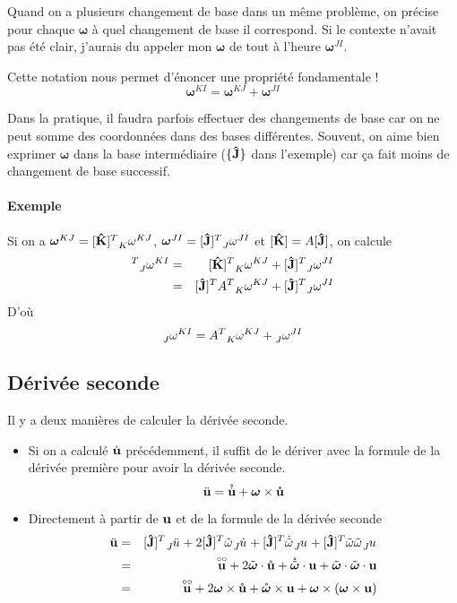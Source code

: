 \documentclass[11pt,a4paper]{article}
\newcommand\fv[1]{{\bf #1}} %
\newcommand\fvd[1]{\dot{\bf #1}} %
\newcommand\fvdd[1]{\ddot{\bf #1}} %
\newcommand\fvr[1]{\mathring{\bf #1}} %
\newcommand\fvrr[1]{\overset{\circ\circ}{\bf #1}} %
\newcommand\uj{{\bf\hat{J}}} %
\newcommand\uk{{\bf\hat{K}}} %
\newcommand\wrt[2]{\ensuremath{\tensor*[_{ #1}]{ #2}{}}} %
\newcommand\wtr[3]{\ensuremath{\tensor*[_{ #1}]{ #2}{^{ #3}}}} %
\newcommand\omegaf{{\bm \omega}}
\newcommand\omegafr{\mathring{\bm \omega}}
\newcommand\omegaft{\tilde{\bm \omega}}
\newcommand\omegaftr{\mathring{\tilde{\bm \omega}}}
\newcommand\omegat{\tilde{\omega}}
\begin{document}
Quand on a plusieurs changement de base dans un même problème, on précise pour chaque $\omegaf$ à quel changement de base il correspond.
Si le contexte n'avait pas été clair, j'aurais du appeler mon $\omegaf$ de tout à l'heure $\omegaf^{JI}$.

Cette notation nous permet d'énoncer une propriété fondamentale !
\[ \omegaf^{KI} = \omegaf^{KJ} + \omegaf^{JI} \]

Dans la pratique, il faudra parfois effectuer des changements de base car on ne peut somme des coordonnées dans des bases différentes.
Souvent, on aime bien exprimer $\omegaf$ dans la base intermédiaire ($\{\uj\}$ dans l'exemple) car ça fait moins de changement de base successif.

\paragraph{Exemple}
Si on a $\omegaf^{KJ} = [\uk]^T \wtr{K}{\omega}{KJ}$, $\omegaf^{JI} = [\uj]^T \wtr{J}{\omega}{JI}$ et $[\uk] = A[\uj]$, on calcule
\begin{eqnarray*}
	[\uj]^T \wtr{J}{\omega}{KI} &=& [\uk]^T \wtr{K}{\omega}{KJ} + [\uj]^T \wtr{J}{\omega}{JI}\\
	&=& [\uj]^T A^T \wtr{K}{\omega}{KJ} + [\uj]^T \wtr{J}{\omega}{JI}
\end{eqnarray*}
D'où
\[ \wtr{J}{\omega}{KI} = A^T \wtr{K}{\omega}{KJ} + \wtr{J}{\omega}{JI} \]

\subsection{Dérivée seconde}
Il y a deux manières de calculer la dérivée seconde.
\begin{itemize}
	\item
		Si on a calculé $\fvd{u}$ précédemment, il suffit de le dériver avec la formule de la dérivée première pour avoir la dérivée seconde.
		\[ \fvdd{u} = \mathring{\fvd{u}} + \omegaf \times \fvd{u} \]
	\item
		Directement à partir de $\fv{u}$ et de la formule de la dérivée seconde
		\begin{eqnarray*}
			\fvdd{u} &=&  [\uj]^T \wrt{J}{\ddot{u}} + 2 [\uj]^T \omegat\wrt{J}{\dot{u}} + [\uj]^T \dot{\omegat}\wrt{J}{u} + [\uj]^T \omegat\omegat\wrt{J}{u}\\
			&=& \fvrr{u} + 2 \omegaft \cdot \fvr{u} + \omegaftr \cdot \fv{u} + \omegaft \cdot \omegaft \cdot \fv{u}\\
			&=& \fvrr{u} + 2 \omegaf \times \fvr{u} + \omegafr \times \fv{u} + \omegaf \times (\omegaf \times \fv{u})
		\end{eqnarray*}
\end{itemize}
\end{document}
